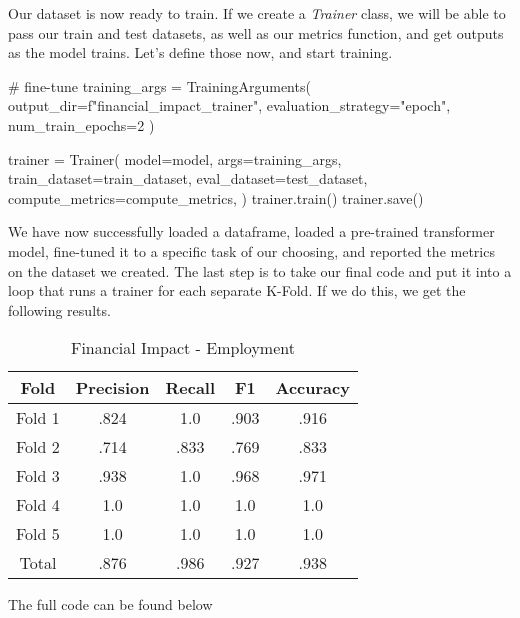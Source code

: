 Our dataset is now ready to train. If we create a \textit{Trainer} class, we will be able to pass our train and test
datasets, as well as our metrics function, and get outputs as the model trains. Let's define those now, and start training.

\begin{python}
# fine-tune
training_args = TrainingArguments(
    output_dir=f"financial_impact_trainer",
    evaluation_strategy="epoch",
    num_train_epochs=2
)

trainer = Trainer(
    model=model,
    args=training_args,
    train_dataset=train_dataset,
    eval_dataset=test_dataset,
    compute_metrics=compute_metrics,
)
trainer.train()
trainer.save()
\end{python}

We have now successfully loaded a dataframe, loaded a pre-trained transformer model, fine-tuned it to a specific task
of our choosing, and reported the metrics on the dataset we created. The last step is to take our final code and put
it into a loop that runs a trainer for each separate K-Fold. If we do this, we get the following results.

\begin{table}[htbp]
    \centering
    \caption{Financial Impact - Employment}
    \begin{tabular}{|c|c|c|c|c|}
        \hline
        Fold & Precision & Recall & F1 & Accuracy \\
        \hline
        Fold 1 & .824 & 1.0 & .903 & .916 \\
        \hline
        Fold 2 & .714 & .833 & .769 & .833 \\
        \hline
        Fold 3 & .938 & 1.0 & .968 & .971 \\
        \hline
        Fold 4 & 1.0 & 1.0 & 1.0 & 1.0 \\
        \hline
        Fold 5 & 1.0 & 1.0 & 1.0 & 1.0 \\
        \hline
        Total & .876 & .986 & .927 & .938 \\
        \hline
    \end{tabular}
\end{table}

The full code can be found below

